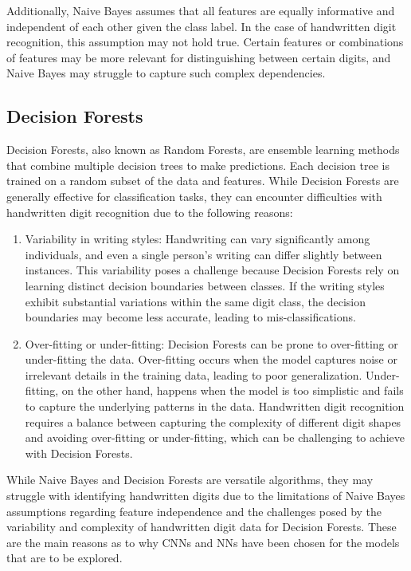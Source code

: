 \documentclass[a4paper,twoside,10pt]{article}
\begin{document}
Additionally, Naive Bayes assumes that all features are equally informative and independent of each other given the class label. In the case of handwritten digit recognition, this assumption may not hold true. Certain features or combinations of features may be more relevant for distinguishing between certain digits, and Naive Bayes may struggle to capture such complex dependencies.

\subsection{Decision Forests}
Decision Forests, also known as Random Forests, are ensemble learning methods that combine multiple decision trees to make predictions. Each decision tree is trained on a random subset of the data and features. While Decision Forests are generally effective for classification tasks, they can encounter difficulties with handwritten digit recognition due to the following reasons:
\begin{enumerate}
    \item Variability in writing styles: Handwriting can vary significantly among individuals, and even a single person's writing can differ slightly between instances. This variability poses a challenge because Decision Forests rely on learning distinct decision boundaries between classes. If the writing styles exhibit substantial variations within the same digit class, the decision boundaries may become less accurate, leading to mis-classifications.
    \item Over-fitting or under-fitting: Decision Forests can be prone to over-fitting or under-fitting the data. Over-fitting occurs when the model captures noise or irrelevant details in the training data, leading to poor generalization. Under-fitting, on the other hand, happens when the model is too simplistic and fails to capture the underlying patterns in the data. Handwritten digit recognition requires a balance between capturing the complexity of different digit shapes and avoiding over-fitting or under-fitting, which can be challenging to achieve with Decision Forests.
\end{enumerate}

While Naive Bayes and Decision Forests are versatile algorithms, they may struggle with identifying handwritten digits due to the limitations of Naive Bayes assumptions regarding feature independence and the challenges posed by the variability and complexity of handwritten digit data for Decision Forests. These are the main reasons as to why CNNs and NNs have been chosen for the models that are to be explored.
\end{document}
